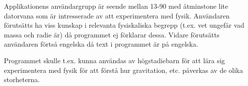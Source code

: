 Applikationens användargrupp är seende mellan 13-90 med åtminstone
lite datorvana som är intresserade av att experimentera med fysik.
Användaren förutsätts ha viss kunskap i relevanta fysiskaliska
begrepp (t.ex. vet ungefär vad massa och radie är) då programmet
ej förklarar dessa. Vidare förutsätts användaren förtså engelska
då text i programmet är på engelska.

Programmet skulle t.ex. kunna användas av högstadiebarn för att lära sig
experimentera med fysik för att förstå hur gravitation, etc. påverkas
av de olika storheterna.

